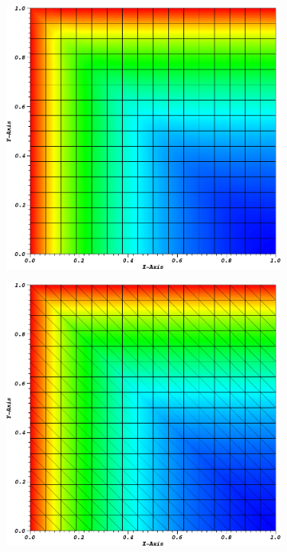 \begin{figure}
\centering
{
	\begin{subfigure}[b]{0.485\textwidth}
		\centering
		\label{subfig::PA_Mesh_Tri}
		\includegraphics[width=\textwidth]{figures/sec_BF/PALeftTopSol_Cart.png}
	\end{subfigure}
	\hfill
	\begin{subfigure}[b]{0.485\textwidth}
		\centering
		\label{subfig::PA_Mesh_Cart}
		\includegraphics[width=\textwidth]{figures/sec_BF/PALeftTopSol_Tri.png}

\end{subfigure}}
\end{figure}
